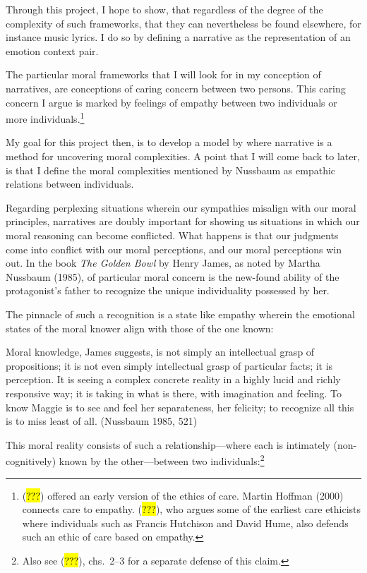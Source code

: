 \documentclass[
  letterpaper,
  DIV=11,
  numbers=noendperiod]{scrartcl}
\theoremstyle{remark}
\begin{document}
Through this project, I hope to show, that regardless of the degree of
the complexity of such frameworks, that they can nevertheless be found
elsewhere, for instance music lyrics. I do so by defining a narrative as
the representation of an emotion context pair.

The particular moral frameworks that I will look for in my conception of
narratives, are conceptions of caring concern between two persons. This
caring concern I argue is marked by feelings of empathy between two
individuals or more individuals.\footnote{(\hl{???}) offered an early
  version of the ethics of care. Martin Hoffman (2000) connects care to
  empathy. (\hl{???}), who argues some of the earliest care ethicists
  where individuals such as Francis Hutchison and David Hume, also
  defends such an ethic of care based on empathy.}

My goal for this project then, is to develop a model by where narrative
is a method for uncovering moral complexities. A point that I will come
back to later, is that I define the moral complexities mentioned by
Nussbaum as empathic relations between individuals.

Regarding perplexing situations wherein our sympathies misalign with our
moral principles, narratives are doubly important for showing us
situations in which our moral reasoning can become conflicted. What
happens is that our judgments come into conflict with our moral
perceptions, and our moral perceptions win out. In the book \emph{The
Golden Bowl} by Henry James, as noted by Martha Nussbaum (1985), of
particular moral concern is the new-found ability of the protagonist's
father to recognize the unique individuality possessed by her.

The pinnacle of such a recognition is a state like empathy wherein the
emotional states of the moral knower align with those of the one known:

Moral knowledge, James suggests, is not simply an intellectual grasp of
propositions; it is not even simply intellectual grasp of particular
facts; it is perception. It is seeing a complex concrete reality in a
highly lucid and richly responsive way; it is taking in what is there,
with imagination and feeling. To know Maggie is to see and feel her
separateness, her felicity; to recognize all this is to miss least of
all. (Nussbaum 1985, 521)

This moral reality consists of such a relationship---where each is
intimately (non-cognitively) known by the other---between two
individuals:\footnote{Also see (\hl{???}), chs.~2--3 for a separate
  defense of this claim.}
\end{document}
